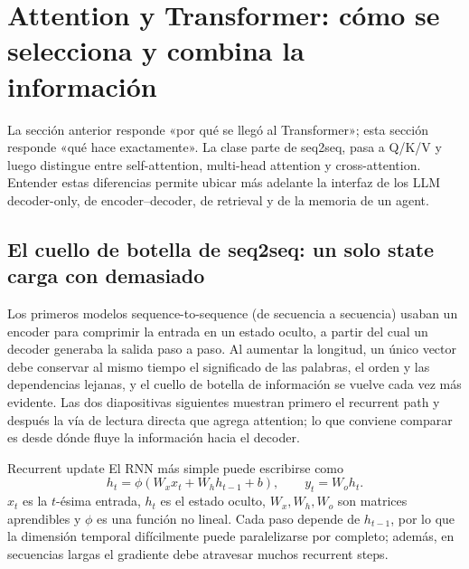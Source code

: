\section{Attention y Transformer: cómo se selecciona y combina la información}

La sección anterior responde «por qué se llegó al Transformer»; esta sección responde «qué hace exactamente». La clase parte de seq2seq, pasa a Q/K/V y luego distingue entre self-attention, multi-head attention y cross-attention. Entender estas diferencias permite ubicar más adelante la interfaz de los LLM decoder-only, de encoder--decoder, de retrieval y de la memoria de un agent.

\subsection{El cuello de botella de seq2seq: un solo state carga con demasiado}

Los primeros modelos sequence-to-sequence (de secuencia a secuencia) usaban un encoder para comprimir la entrada en un estado oculto, a partir del cual un decoder generaba la salida paso a paso. Al aumentar la longitud, un único vector debe conservar al mismo tiempo el significado de las palabras, el orden y las dependencias lejanas, y el cuello de botella de información se vuelve cada vez más evidente. Las dos diapositivas siguientes muestran primero el recurrent path y después la vía de lectura directa que agrega attention; lo que conviene comparar es desde dónde fluye la información hacia el decoder.


\begin{importantbox}{Recurrent update}
El RNN más simple puede escribirse como
\[
h_t=\phi(W_xx_t+W_hh_{t-1}+b),\qquad y_t=W_oh_t.
\]
$x_t$ es la $t$-ésima entrada, $h_t$ es el estado oculto, $W_x,W_h,W_o$ son matrices aprendibles y $\phi$ es una función no lineal. Cada paso depende de $h_{t-1}$, por lo que la dimensión temporal difícilmente puede paralelizarse por completo; además, en secuencias largas el gradiente debe atravesar muchos recurrent steps.
\end{importantbox}


